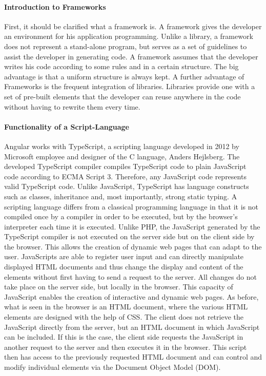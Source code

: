 \paragraph{Introduction to Frameworks}
First, it should be clarified what a framework is.
A framework gives the developer an environment for his application programming.
Unlike a library, a framework does not represent a stand-alone program, but serves as a set of guidelines to assist the
developer in generating code.
A framework assumes that the developer writes his code according to some rules and in a certain structure.
The big advantage is that a uniform structure is always kept.
A further advantage of Frameworks is the frequent integration of libraries.
Libraries provide one with a set of pre-built elements that the developer can reuse anywhere in the code without having
to rewrite them every time.

\paragraph{Functionality of a Script-Language}
Angular works with TypeScript, a scripting language developed in 2012 by Microsoft employee and designer of the C
language, Anders Hejlsberg.
The developed TypeScript compiler compiles TypeScript code to plain JavaScript code according to ECMA Script 3.
Therefore, any JavaScript code represents valid TypeScript code.
Unlike JavaScript, TypeScript has language constructs such as classes, inheritance and, most importantly, strong static
typing.
A scripting language differs from a classical programming language in that it is not compiled once by a compiler in
order to be executed, but by the browser's interpreter each time it is executed.
Unlike PHP, the JavaScript generated by the TypeScript compiler is not executed on the server side but on the client
side by the browser.
This allows the creation of dynamic web pages that can adapt to the user.
JavaScripts are able to register user input and can directly manipulate displayed HTML documents and thus change the
display and content of the elements without first having to send a request to the server.
All changes do not take place on the server side, but locally in the browser.
This capacity of JavaScript enables the creation of interactive and dynamic web pages.
As before, what is seen in the browser is an HTML document, where the various HTML elements are designed with the help
of CSS.
The client does not retrieve the JavaScript directly from the server, but an HTML document in which JavaScript can be
included.
If this is the case, the client side requests the JavaScript in another request to the server and then executes it in
the browser.
This script then has access to the previously requested HTML document and can control and modify individual elements
via the Document Object Model (DOM).

